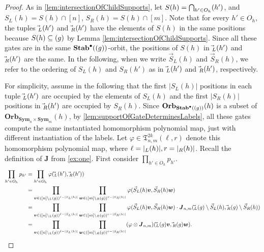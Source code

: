 \documentclass[11pt, DIV=15]{scrarticle}
\theoremstyle{definition}
\theoremstyle{plain}
\theoremstyle{remark}
\renewcommand{\phi}{\varphi}
\newcommand{\Sym}{\mathbf{Sym}}
\newcommand{\Stab}{\mathbf{Stab}}
\newcommand{\StabP}{\Stab^{\bullet}}
\newcommand{\Orb}{\mathbf{Orb}}
\let\sup\relax
\DeclareMathOperator{\sup}{sup}
\begin{document}
 	\begin{proof}
 		As in \cref{lem:intersectionOfChildSupports}, let $S(h) = \bigcap_{h' \in O_h} \sup(h')$, and $S_L(h) = S(h) \cap [n]$, $S_R(h) = S(h) \cap [m]$.
  		Note that for every $h' \in O_h$, the tuples $\vec{\sup}_L(h')$ and $\vec{\sup}_R(h')$ have the elements of $S(h)$ in the same positions because $S(h) \subseteq \sup(g)$ by Lemma \ref{lem:intersectionOfChildSupports}. Since all these gates are in the same $\StabP(\sup(g))$-orbit, the positions of $S(h)$ in $\vec{\sup}_L(h')$ and $\vec{\sup}_R(h')$ are the same. In the following, when we write $\vec{S}_L(h)$ and $\vec{S}_R(h)$, we refer to the ordering of $S_L(h)$ and $S_R(h')$ as in $\vec{\sup}_L(h')$ and $\vec{\sup}_R(h')$, respectively. 
 		
		For simplicity, assume in the following that the first $|S_L(h)|$ positions in each tuple $\vec{\sup}_L(h')$ are occupied by the elements of $S_L(h)$ and the first $|S_R(h)|$ positions in $\vec{\sup}_R(h')$ are occupied by $S_R(h)$. 
 		Since $\Orb_{\StabP(\sup(g))}(h)$ is a subset of $\Orb_{\Sym_n \times \Sym_m}(h)$, by \cref{lem:supportOfGateDeterminesLabels}, all these gates compute the same instantiated homomorphism polynomial map, just with different instantiation of the labels.
 		Let $\phi \in \mathfrak{T}_{n,m}^{2k}(\ell , r)$ denote this homomorphism polynomial map, where $\ell = |\sup_L(h)|, r = |\sup_R(h)|$. 
 		Recall the definition of $\boldsymbol{J}$ from \cref{ex:one}.
 		First consider $\prod_{h' \in O_h} p_{h'}$. 
 		\begin{align*}
 		 \prod_{h' \in O_h} p_{h'} 
 		 &= \prod_{h' \in O_h}  \phi(\vec{\sup}_L(h'), \vec{\sup}_R(h')) \\
 		 &= \prod_{\boldsymbol{v} \in ([n] \setminus \sup_L(g))^{\ell - |S_L(h)|}} \prod_{\boldsymbol{w} \in ([m] \setminus \sup_R(g))^{r - |S_R(h)|}} \phi(\vec{S}_L(h) \boldsymbol{v}, \vec{S}_R(h) \boldsymbol{w})  \\
 		 &= \prod_{\boldsymbol{v} \in ([n] \setminus \sup_L(g))^{\ell - |S_L(h)|}} \prod_{\boldsymbol{w} \in ([m] \setminus \sup_R(g))^{r - |S_R(h)|}} \phi(\vec{S}_L(h) \boldsymbol{v}, \vec{S}_R(h) \boldsymbol{w})
 		  \cdot \boldsymbol{J}_{n,m}(\vec{\sup}_L(g) \setminus \vec{S}_L(h), \vec{\sup}_R(g) \setminus \vec{S}_R(h))\\
 		  &= \prod_{\boldsymbol{v} \in ([n] \setminus \sup_L(g))^{\ell - |S_L(h)|}} \prod_{\boldsymbol{w} \in ([m] \setminus \sup_R(g))^{r - |S_R(h)|}} (\phi \otimes \boldsymbol{J}_{n,m})(\vec{\sup}_L(g) \boldsymbol{v}, \vec{\sup}_R(g) \boldsymbol{w}). 

\end{align*}
\end{proof}
\end{document}
